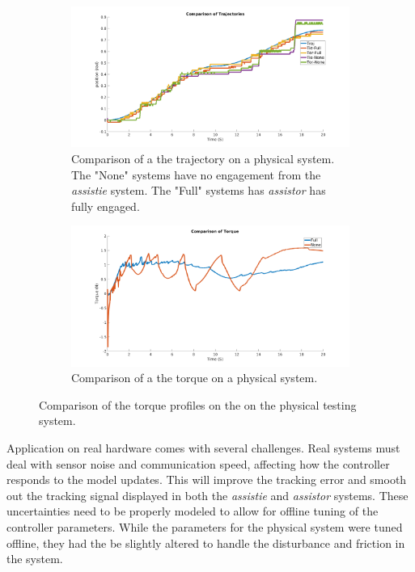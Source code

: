 \begin{figure}[h!]
    \centering
    \begin{subfigure}{\linewidth}
        \centering
        \includegraphics[width=\columnwidth]{images/controllers/comptraj2.png}
        \caption[Physical System Trajectory Tracking]{Comparison of a the trajectory on a physical system. The "None" systems have no engagement from the \textit{assistie} system. The "Full" systems has \textit{assistor} has fully engaged. }
        \label{fig:phyicalTraj}
    \end{subfigure}
        \begin{subfigure}{\linewidth}
        \centering
        \includegraphics[width=\columnwidth]{images/controllers/comparisonOfTorque.png}
        \caption[Comparison of Torque for Full and No Engagement]{Comparison of a the torque on a physical system.}
        \label{fig:phyicalTorque}
    \end{subfigure}
    \caption[Physical System Engagement Levels]{Comparison of the torque profiles on the on the physical testing system.}
    \label{fig:phyicalSystemResults}
\end{figure}

 Application on real hardware comes with several challenges. Real systems must deal with sensor noise and communication speed, affecting how the controller responds to the model updates. This will improve the tracking error and smooth out the tracking signal displayed in both the  \textit{assistie}  and \textit{assistor} systems. These uncertainties need to be properly modeled to allow for offline tuning of the controller parameters. While the parameters for the physical system were tuned offline, they had the be slightly altered to handle the disturbance and friction in the system.  